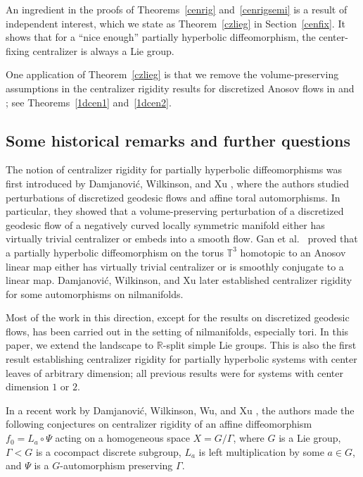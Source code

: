 \documentclass[11pt]{amsart}
\numberwithin{equation}{section}
\newcommand{\R}{\mathbb{R}}
\theoremstyle{plain}
\begin{document}
An ingredient in the proofs of Theorems~\ref{cenrig} and~\ref{cenrigsemi} is a result of independent interest, which we state as Theorem~\ref{czlieg} in Section~\ref{cenfix}. It shows that for a ``nice enough'' partially hyperbolic diffeomorphism, the center-fixing centralizer is always a Lie group.

One application of Theorem~\ref{czlieg} is that we remove the volume-preserving assumptions in the centralizer rigidity results for discretized Anosov flows in \cite{DWX} and \cite{BG}; see Theorems~\ref{1dcen1} and~\ref{1dcen2}.


\subsection{Some historical remarks and further questions}

The notion of centralizer rigidity for partially hyperbolic diffeomorphisms was first introduced by Damjanović, Wilkinson, and Xu \cite{DWX}, where the authors studied perturbations of discretized geodesic flows and affine toral automorphisms. In particular, they showed that a volume-preserving perturbation of a discretized geodesic flow of a negatively curved locally symmetric manifold either has virtually trivial centralizer or embeds into a smooth flow.
Gan et al.\ \cite{GSXZ} proved that a partially hyperbolic diffeomorphism on the torus $\mathbb{T}^3$ homotopic to an Anosov linear map either has virtually trivial centralizer or is smoothly conjugate to a linear map.
Damjanović, Wilkinson, and Xu \cite{DWX23} later established centralizer rigidity for some automorphisms on nilmanifolds.

Most of the work in this direction, except for the results on discretized geodesic flows, has been carried out in the setting of nilmanifolds, especially tori. In this paper, we extend the landscape to $\R$-split simple Lie groups. This is also the first result establishing centralizer rigidity for partially hyperbolic systems with center leaves of arbitrary dimension; all previous results were for systems with center dimension $1$ or $2$.

In a recent work by Damjanović, Wilkinson, Wu, and Xu \cite{DWWX}, the authors made the following conjectures on centralizer rigidity of an affine diffeomorphism $f_0=L_a\circ \Psi$ acting on a homogeneous space $X=G/\Gamma$, where $G$ is a Lie group, $\Gamma<G$ is a cocompact discrete subgroup, $L_a$ is left multiplication by some $a\in G$, and $\Psi$ is a $G$-automorphism preserving $\Gamma$.
\end{document}
